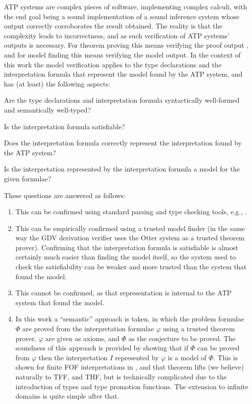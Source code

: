 \documentclass{easychair}
\newenvironment{packed_enumerate}{
\vspace*{-0.2em}
\begin{enumerate}
\setlength{\partopsep}{0pt}
\setlength{\itemsep}{1pt}
\setlength{\parskip}{0pt}
\setlength{\parsep}{0pt}
}{\end{enumerate}}
\begin{document}
ATP systems are complex pieces of software, implementing complex calculi, with the end goal
being a sound implementation of a sound inference system whose output correctly corroborates the
result obtained.
The reality is that the complexity leads to incorrectness, and as such verification of ATP systems'
outputs is necessary. 
For theorem proving this means verifying the proof output \cite{Sut06}, and for model finding 
this means verifying the model output.
In the context of this work the model verification applies to the type declarations and 
the interpretation formula that represent the model found by the ATP system, and
has (at least) the following aspects:
\begin{packed_enumerate}
\item Are the type declarations and interpretation formula syntactically well-formed 
      and semantically well-typed?
\item Is the interpretation formula satisfiable?
\item Does the interpretation formula correctly represent the interpretation found by the 
      ATP system?
\item Is the interpretation represented by the interpretation formula a model for the given 
      formulae?
\end{packed_enumerate}
\noindent
These questions are answered as follows:
\begin{enumerate}
\item This can be confirmed using standard parsing and type checking tools, e.g., \cite{VS06,HR15}.
\item This can be empirically confirmed using a trusted model finder (in the same way the GDV 
      derivation verifier \cite{Sut06} uses the Otter system \cite{McC03-Otter} as a trusted 
      theorem prover).
      Confirming that the interpretation formula is satisfiable is almost certainly much 
      easier than finding the model itself, so the system used to check the satisfiability can 
      be weaker and more trusted than the system that found the model.
\item This cannot be confirmed, as that representation is internal to the ATP system that found
      the model.
\item In this work a ``semantic'' approach is taken, in which the problem formulae $\Phi$ are 
      proved from the interpretation formulae $\varphi$ using a trusted theorem prover. 
      $\varphi$ are given as axioms, and $\Phi$ as the conjecture to be proved.
      The soundness of this approach is provided by showing that if $\Phi$ can be proved from 
      $\varphi$ then the interpretation $I$ represented by $\varphi$ is a model of $\Phi$.
      This is shown for finite FOF interpretations in \cite{SS+23-LPAR}, and that theorem lifts 
      (we believe) naturally to TFF, and THF, but is technically complicated due to the 
      introduction of types and type promotion functions. 
      The extension to infinite domains is quite simple after that.
\end{enumerate}
      
\end{document}
